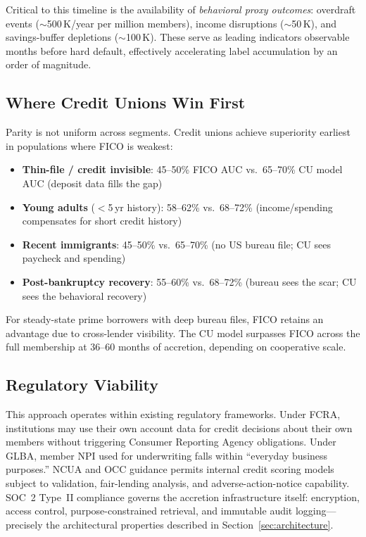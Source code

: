 \documentclass[11pt,twocolumn]{article}
\begin{document}
Critical to this timeline is the availability of \emph{behavioral proxy outcomes}: overdraft events ($\sim$500\,K/year per million members), income disruptions ($\sim$50\,K), and savings-buffer depletions ($\sim$100\,K). These serve as leading indicators observable months before hard default, effectively accelerating label accumulation by an order of magnitude.

\subsection{Where Credit Unions Win First}

Parity is not uniform across segments. Credit unions achieve superiority earliest in populations where FICO is weakest:

\begin{itemize}[nosep,leftmargin=1.2em]
  \item \textbf{Thin-file / credit invisible}: 45--50\% FICO AUC vs.\ 65--70\% CU model AUC (deposit data fills the gap)
  \item \textbf{Young adults} ($<$5\,yr history): 58--62\% vs.\ 68--72\% (income/spending compensates for short credit history)
  \item \textbf{Recent immigrants}: 45--50\% vs.\ 65--70\% (no US bureau file; CU sees paycheck and spending)
  \item \textbf{Post-bankruptcy recovery}: 55--60\% vs.\ 68--72\% (bureau sees the scar; CU sees the behavioral recovery)
\end{itemize}

For steady-state prime borrowers with deep bureau files, FICO retains an advantage due to cross-lender visibility. The CU model surpasses FICO across the full membership at 36--60 months of accretion, depending on cooperative scale.

\subsection{Regulatory Viability}

This approach operates within existing regulatory frameworks. Under FCRA, institutions may use their own account data for credit decisions about their own members without triggering Consumer Reporting Agency obligations. Under GLBA, member NPI used for underwriting falls within ``everyday business purposes.'' NCUA and OCC guidance permits internal credit scoring models subject to validation, fair-lending analysis, and adverse-action-notice capability. SOC~2 Type~II compliance governs the accretion infrastructure itself: encryption, access control, purpose-constrained retrieval, and immutable audit logging---precisely the architectural properties described in Section~\ref{sec:architecture}.
\end{document}
